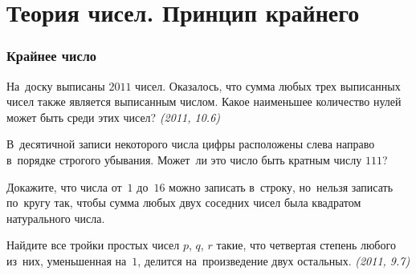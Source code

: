
\section*{Теория чисел. Принцип крайнего}


\subsubsection*{Крайнее число}

\begin{problems}

\item
На~доску выписаны $2011$ чисел.
Оказалось, что сумма любых трех выписанных чисел также является выписанным
числом.
Какое наименьшее количество нулей может быть среди этих чисел?
\emph{(2011, 10.6)}


\item
В~десятичной записи некоторого числа цифры расположены слева направо в~порядке
строгого убывания.
Может~ли это число быть кратным числу $111$?

\item
Докажите, что числа от~$1$ до~$16$ можно записать в~строку, но~нельзя записать
по~кругу так, чтобы сумма любых двух соседних чисел была квадратом натурального
числа.



\item
Найдите все тройки простых чисел $p$, $q$, $r$ такие, что четвертая степень
любого из~них, уменьшенная на~$1$, делится на~произведение двух остальных.
\emph{(2011, 9.7)}


\end{problems}



